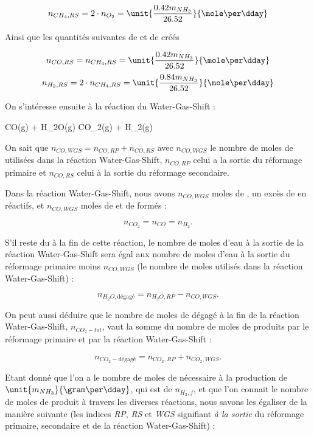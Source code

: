 $$n_{CH_4,RS} = 2 \cdot n_{O_2} = \unit{\frac{0.42m_{NH_3}}{26.52}}{\mole\per\dday}$$

Ainsi que les quantités suivantes de  et de  créés 

$$n_{CO,RS} = n_{CH_4,RS} =  \unit{\frac{0.42m_{NH_3}}{26.52}} {\mole\per\dday}$$
$$n_{H_2,RS} = 2 \cdot n_{CH_4,RS} =  \unit{\frac{0.84m_{NH_3}}{26.52}}{\mole\per\dday}$$

On s'intéresse ensuite à la réaction du Water-Gas-Shift : 

\begin{chemmath}
	CO(g) + H_2O(g) \Longrightarrow CO_2(g) + H_2(g)
\end{chemmath} 

On sait que $n_{CO,WGS} = n_{CO,RP} + n_{CO,RS}$ avec $n_{CO,WGS}$ 
le nombre de moles de  utilisées dans la réaction Water-Gas-Shift,
$n_{CO,RP}$ celui a la sortie du réformage primaire et $n_{CO,RS}$ celui 
à la sortie du réformage secondaire.

Dans la réaction Water-Gas-Shift, nous avons $n_{CO,WGS}$ moles de ,
un excès de  en réactifs, et $n_{CO,WGS}$ moles de  et de 
 formés :

$$n_{CO_2} = n_{CO} = n_{H_2}.$$

S'il reste du  à la fin de cette réaction, le nombre de moles d'eau
à la sortie de la réaction Water-Gas-Shift sera égal aux nombre de moles d'eau à la
sortie du réformage primaire moins $n_{CO,WGS}$ (le nombre de moles utilisés dans 
la réaction Water-Gas-Shift) :

$$n_{H_2O,\text{dégagé}} = n_{{H_2O,RP}}- n_{CO,WGS}.$$

On peut aussi déduire que le nombre de moles de  dégagé à la fin de la 
réaction Water-Gas-Shift, $n_{CO_2-tot}$, vaut la somme du nombre de moles de 
produits par le réformage primaire et par la réaction Water-Gas-Shift : 

$$n_{CO_2-\text{dégagé}} = n_{{CO_2,RP}} + n_{{CO_2,WGS}}.$$

Etant donné que l'on a le nombre de moles de  nécessaire à la production de
$\unit{m_{NH_3}}{\gram\per\dday}$, qui est de $n_{H_2,f}$, et que l'on connait le 
nombre de moles de  produit à travers les diverses réactions, nous savons 
les égaliser de la manière suivante (les indices \textit{RP}, \textit{RS} et \textit{WGS}
signifiant \textit{à la sortie} du réformage primaire, secondaire et de la réaction Water-Gas-Shift) : 


